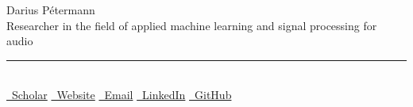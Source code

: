 \begin{center}
    \Huge{Darius P\'etermann} \\ \vspace{40pt}
    \normalsize Researcher in the field of applied machine learning and signal processing for audio
    \noindent\rule{15cm}{1pt}
    \vspace{5pt} \\
    \href{https://scholar.google.com/citations?user=e5ARpUAAAAAJ&hl=en}{\color{red}\faGraduationCap \ Scholar} \qquad
    \href{https://www.dariuspetermann.com}{\color{red}\faGlobe \ Website} \qquad
    \href{mailto:darius.petermann@gmail.com}{\color{red}\faPaperPlane \ Email} \qquad
    \href{https://www.linkedin.com/in/darius-petermann}{\color{red}\faLinkedin \ LinkedIn} \qquad
    \href{https://github.com/darius522}{\color{red}\faGithub \ GitHub} \qquad
    \vspace{30pt} \\
\end{center}